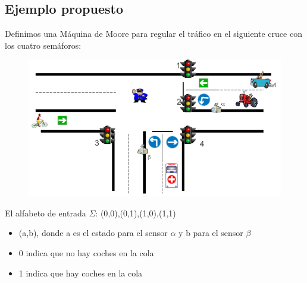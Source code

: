 \documentclass[12pt,a4paper]{article}
\begin{document}
	
	\newpage
	\subsection{Ejemplo propuesto}
	Definimos una Máquina de Moore para regular el tráfico en el siguiente cruce con los cuatro semáforos:
		
	\begin{figure}[h]
		\centering
		\includegraphics[width=0.4
		\linewidth]{img/4}
		\caption{}
		\label{fig:4}
	\end{figure}

El alfabeto de entrada $\Sigma$: {(0,0),(0,1),(1,0),(1,1)}

	\begin{itemize}
		\item (a,b), donde a es el estado para el sensor $\alpha$ y b para el sensor $\beta$
		\item 0 indica que no hay coches en la cola
		\item 1 indica que hay coches en la cola
	\end{itemize}
\end{document}
